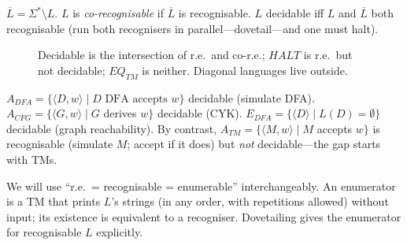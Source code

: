 \begin{definition}
$\overline{L}=\Sigma^*\setminus L$. $L$ is \emph{co-recognisable} if $\overline{L}$ is recognisable. $L$ decidable iff $L$ and $\overline{L}$ both recognisable (run both recognisers in parallel---dovetail---and one must halt).
\end{definition}

\begin{figure}[h]
\centering
{}
\caption{Decidable is the intersection of r.e.\ and co-r.e.; $HALT$ is r.e.\ but not decidable; $EQ_{TM}$ is neither. Diagonal languages live outside.}
\label{fig:decidable-landscape}
\end{figure}

\begin{example}
$A_{DFA}=\{\langle D,w\rangle\mid D\text{ DFA accepts }w\}$ decidable (simulate DFA). $A_{CFG}=\{\langle G,w\rangle\mid G$ derives $w\}$ decidable (CYK). $E_{DFA}=\{\langle D\rangle\mid L(D)=\emptyset\}$ decidable (graph reachability). By contrast, $A_{TM}=\{\langle M,w\rangle\mid M$ accepts $w\}$ is recognisable (simulate $M$; accept if it does) but \emph{not} decidable---the gap starts with TMs.
\end{example}

\begin{remark}[Recognisable = enumerable]
We will use ``r.e.\ = recognisable = enumerable'' interchangeably. An enumerator is a TM that prints $L$'s strings (in any order, with repetitions allowed) without input; its existence is equivalent to a recogniser. Dovetailing gives the enumerator for recognisable $L$ explicitly.
\end{remark}

